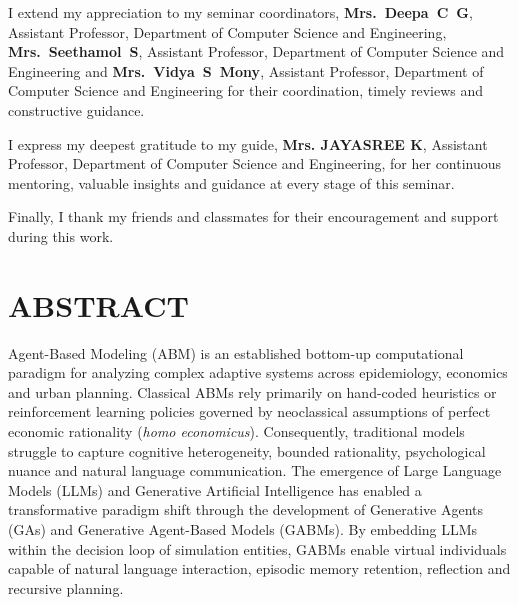 \documentclass[12pt,a4paper]{report}
\newcommand{\guidename}{Mrs. JAYASREE K}
\begin{document}
I extend my appreciation to my seminar coordinators, \textbf{Mrs.~Deepa~C~G}, Assistant Professor, Department of Computer Science and Engineering, \textbf{Mrs.~Seethamol~S}, Assistant Professor, Department of Computer Science and Engineering and \textbf{Mrs.~Vidya~S~Mony}, Assistant Professor, Department of Computer Science and Engineering for their coordination, timely reviews and constructive guidance.

I express my deepest gratitude to my guide, \textbf{\guidename}, Assistant Professor, Department of Computer Science and Engineering, for her continuous mentoring, valuable insights and guidance at every stage of this seminar.

Finally, I thank my friends and classmates for their encouragement and support during this work.

\newpage


\chapter*{ABSTRACT}

Agent-Based Modeling (ABM) is an established bottom-up computational paradigm for analyzing complex adaptive systems across epidemiology, economics and urban planning. Classical ABMs rely primarily on hand-coded heuristics or reinforcement learning policies governed by neoclassical assumptions of perfect economic rationality (\textit{homo economicus}). Consequently, traditional models struggle to capture cognitive heterogeneity, bounded rationality, psychological nuance and natural language communication. The emergence of Large Language Models (LLMs) and Generative Artificial Intelligence has enabled a transformative paradigm shift through the development of Generative Agents (GAs) and Generative Agent-Based Models (GABMs). By embedding LLMs within the decision loop of simulation entities, GABMs enable virtual individuals capable of natural language interaction, episodic memory retention, reflection and recursive planning.
\end{document}
